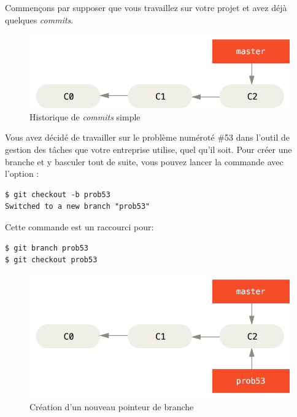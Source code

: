 Commençons par supposer que vous travaillez sur votre projet et avez déjà quelques \emph{commits}.

\begin{figure}[H]
  \centering
  \includegraphics{images/basic-branching-1}
  \caption{Historique de \emph{commits} simple}
  \label{fig:git:basic-branching-1}
\end{figure}

Vous avez décidé de travailler sur le problème numéroté \#53 dans l'outil de gestion des tâches que votre entreprise utilise, quel qu'il soit.
Pour créer une branche et y basculer tout de suite, vous pouvez lancer la commande  avec l'option :
\begin{Schunk}
\begin{Verbatim}
$ git checkout -b prob53
Switched to a new branch "prob53"
\end{Verbatim}
\end{Schunk}

Cette commande est un raccourci pour:
\begin{Schunk}
\begin{Verbatim}
$ git branch prob53
$ git checkout prob53
\end{Verbatim}
\end{Schunk}

\begin{figure}[H]
  \centering
  \includegraphics{images/basic-branching-2}
  \caption{Création d'un nouveau pointeur de branche}
  \label{fig:git:basic-branching-2}
\end{figure}

